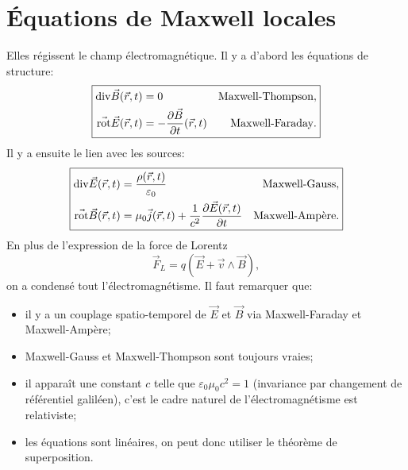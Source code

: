 \section{Équations de Maxwell locales}

Elles régissent le champ électromagnétique. Il y a d'abord les équations de structure:
\begin{equation}
    \boxed{
        \begin{aligned}
            \mathrm{div}\vec{B}(\vec{r},t)&=0&\text{Maxwell-Thompson},\\
            \vec{\mathrm{rot}}\vec{E}(\vec{r},t)&=-\frac{\partial\vec{B}}{\partial t}(\vec{r},t)&\text{Maxwell-Faraday}.
        \end{aligned}
    }
\end{equation}
Il y a ensuite le lien avec les sources:
\begin{equation}
    \boxed{
        \begin{aligned}
            \mathrm{div}\vec{E}(\vec{r},t)&=\frac{\rho(\vec{r},t)}{\varepsilon_0}&\text{Maxwell-Gauss},\\
            \vec{\mathrm{rot}}\vec{B}(\vec{r},t)&=\mu_0\vec{j}(\vec{r},t)+\frac{1}{c^{2}}\frac{\partial\vec{E}(\vec{r},t)}{\partial t}&\text{Maxwell-Ampère}.
        \end{aligned}
    }
\end{equation}
En plus de l'expression de la force de Lorentz
\begin{equation}
    \boxed{
        \vec{F}_L=q(\vec{E}+\vec{v}\wedge\vec{B}),
    }
\end{equation}
on a condensé tout l'électromagnétisme. Il faut remarquer que:
\begin{itemize}
    \item il y a un couplage spatio-temporel de $\vec{E}$ et $\vec{B}$ via Maxwell-Faraday et Maxwell-Ampère;
    \item Maxwell-Gauss et Maxwell-Thompson sont toujours vraies;
    \item il apparaît une constant $c$ telle que $\varepsilon_0\mu_0 c^{2}=1$ (invariance par changement de référentiel galiléen), c'est le cadre naturel de l'électromagnétisme est relativiste;
    \item les équations sont linéaires, on peut donc utiliser le théorème de superposition.
\end{itemize}